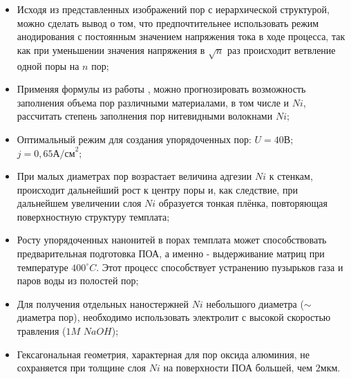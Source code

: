 \begin{itemize}
    \item Исходя из представленных изображений пор с иерархической структурой, можно сделать вывод о том, что предпочтительнее использовать режим анодирования с постоянным значением напряжения тока в ходе процесса, так как при уменьшении значения напряжения в $\sqrt{n}$ раз происходит ветвление одной поры на $n$ пор;
    \item Применяя формулы из работы \cite{gasenkova}, можно прогнозировать возможность заполнения объема пор различными материалами, в том числе и $Ni$, рассчитать степень заполнения пор нитевидными волокнами $Ni$;
    \item Оптимальный режим для создания упорядоченных пор: $U=40\text{В}$; $j=0,65 \text{А/см}^2$;
    \item При малых диаметрах пор возрастает величина адгезии $Ni$ к стенкам, происходит дальнейший рост к центру поры и, как следствие, при дальнейшем увеличении слоя $Ni$ образуется тонкая плёнка, повторяющая поверхностную структуру темплата;
    \item Росту упорядоченных нанонитей в порах темплата может способствовать предварительная подготовка ПОА, а именно - выдерживание матриц при температуре $400^\circ C$. Этот процесс способствует устранению пузырьков газа и паров воды из полостей пор;
    \item Для получения отдельных наностержней $Ni$ небольшого диаметра ($\sim$ диаметра пор), необходимо использовать электролит с высокой скоростью травления ($1M$ $NaOH$);
    \item{Гексагональная геометрия, характерная для пор оксида алюминия, не сохраняется при толщине слоя $Ni$ на поверхности ПОА большей, чем $2 \text{мкм}$.}
\end{itemize}

\clearpage
